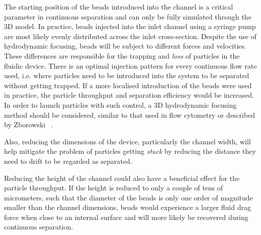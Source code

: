 The starting position of the beads introduced into the channel is a critical parameter in continuous separation and can only be fully simulated through the 3D model. In practice, beads injected into the inlet channel using a syringe pump are most likely evenly distributed across the inlet cross-section. Despite the use of hydrodynamic focusing, beads will be subject to different forces and velocities. These differences are responsible for the trapping and \textit{loss} of particles in the fluidic device. There is an optimal injection pattern for every continuous flow rate used, i.e. where particles need to be introduced into the system to be separated without getting trapped. If a more localised introduction of the beads were used in practice, the particle throughput and separation efficiency would be increased. In order to launch particles with such control, a 3D hydrodynamic focusing method should be considered, similar to that used in flow cytometry or described by Zborowski \etal~\cite{Zborowski2011a,Zhuang2012,Utada2005}. 

Also, reducing the dimensions of the device, particularly the channel width, will help mitigate the problem of particles getting \textit{stuck} by reducing the distance they need to drift to be regarded as separated.

Reducing the height of the channel could also have a beneficial effect for the particle throughput. If the height is reduced to only a couple of tens of micrometers, such that the diameter of the beads is only one order of magnitude smaller than the channel dimensions, beads would experience a larger fluid drag force when close to an internal surface and will more likely be recovered during continuous separation.

